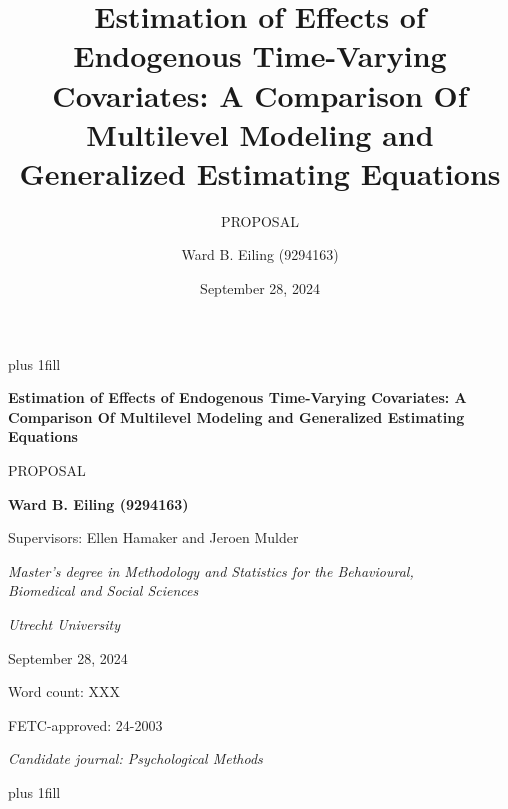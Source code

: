 \documentclass[
  12pt,
  a4paper,
]{article}
\title{Estimation of Effects of Endogenous Time-Varying Covariates: A
Comparison Of Multilevel Modeling and Generalized Estimating Equations}
\subtitle{PROPOSAL}
\author{Ward B. Eiling (9294163)}
\date{September 28, 2024}
\begin{document}
\cleardoublepage
\thispagestyle{empty}
{\centering
\hbox{}\vskip 0cm plus 1fill
{\Large\bfseries Estimation of Effects of Endogenous Time-Varying
Covariates: A Comparison Of Multilevel Modeling and Generalized
Estimating Equations \par}
\vspace{3ex}
{\large PROPOSAL \par}
\vspace{9ex}
{\large\bfseries Ward B. Eiling (9294163) \par}
\vspace{3ex}
{\large Supervisors: Ellen Hamaker and Jeroen Mulder \par}
\vspace{9ex}
{\normalsize \textit{Master's degree in Methodology and Statistics for the Behavioural, \\ Biomedical and Social Sciences} \par}
\vspace{3ex}
{\normalsize \textit{Utrecht University} \par}
\vspace{9ex}
{\normalsize September 28, 2024 \par}
\vspace{3ex}
{\normalsize Word count: XXX \par}
\vspace{9ex}
{\normalsize FETC-approved: 24-2003 \par}
\vspace{9ex}
{\normalsize \textit{Candidate journal: Psychological Methods} \par}
\hbox{}\vskip 0cm plus 1fill
}
\ifdefined\Shaded\renewenvironment{Shaded}{\begin{tcolorbox}[enhanced, boxrule=0pt, interior hidden, sharp corners, breakable, frame hidden, borderline west={3pt}{0pt}{shadecolor}]}{\end{tcolorbox}}\fi
\end{document}
